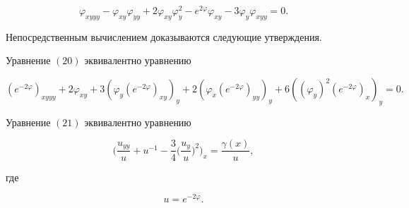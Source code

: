 \begin{equation} 


\varphi_{xyyy}-\varphi_{xy}\varphi_{yy}+ 


2\varphi_{xy}\varphi^2_y-e^{2\varphi}\varphi_{xy} 


-3\varphi_y\varphi_{xyy}=0. 


\end{equation} 


Непосредственным вычислением доказываются следующие утверждения. 


 


 


\begin{lem} 


Уравнение $(20)$ эквивалентно уравнению 


\begin{equation} 


(e^{-2\varphi})_{xyyy}+2\varphi_{xy}+3(\varphi_y(e^{-2\varphi} 


)_{xy})_y+2(\varphi_x(e^{-2\varphi})_{yy})_y+ 


6((\varphi_y)^2(e^{-2\varphi})_x)_y=0. 


\end{equation} 


\end{lem} 


 


\begin{lem} 


Уравнение $(21)$ эквивалентно уравнению 


\begin{equation} 


\bigg(\frac{u_{yy}}{u}+u^{-1}-\frac{3}{4}\bigg(\frac{u_y}{u} 


\bigg)^2\bigg)_x=\frac{\gamma(x)}{u}, 


\end{equation} 


где 


\begin{equation} 


u=e^{-2\varphi}. 


\end{equation} 


\end{lem} 


 



